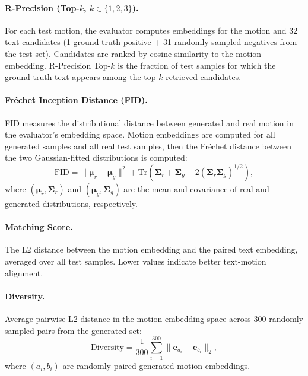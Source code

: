 \documentclass[sigconf, screen, review, anonymous]{acmart}
\begin{document}
\paragraph{R-Precision (Top-$k$, $k \in \{1, 2, 3\}$).}
For each test motion, the evaluator computes embeddings for the motion and 32 text candidates (1 ground-truth positive + 31 randomly sampled negatives from the test set). Candidates are ranked by cosine similarity to the motion embedding. R-Precision Top-$k$ is the fraction of test samples for which the ground-truth text appears among the top-$k$ retrieved candidates.

\paragraph{Fr\'{e}chet Inception Distance (FID).}
FID measures the distributional distance between generated and real motion in the evaluator's embedding space. Motion embeddings are computed for all generated samples and all real test samples, then the Fr\'{e}chet distance between the two Gaussian-fitted distributions is computed:
\begin{equation}
  \text{FID} = \|\boldsymbol{\mu}_r - \boldsymbol{\mu}_g\|^2 + \text{Tr}\left(\boldsymbol{\Sigma}_r + \boldsymbol{\Sigma}_g - 2(\boldsymbol{\Sigma}_r \boldsymbol{\Sigma}_g)^{1/2}\right),
\end{equation}
where $(\boldsymbol{\mu}_r, \boldsymbol{\Sigma}_r)$ and $(\boldsymbol{\mu}_g, \boldsymbol{\Sigma}_g)$ are the mean and covariance of real and generated distributions, respectively.

\paragraph{Matching Score.}
The L2 distance between the motion embedding and the paired text embedding, averaged over all test samples. Lower values indicate better text-motion alignment.

\paragraph{Diversity.}
Average pairwise L2 distance in the motion embedding space across 300 randomly sampled pairs from the generated set:
\begin{equation}
  \text{Diversity} = \frac{1}{300} \sum_{i=1}^{300} \| \mathbf{e}_{a_i} - \mathbf{e}_{b_i} \|_2,
\end{equation}
where $(a_i, b_i)$ are randomly paired generated motion embeddings.
\end{document}
